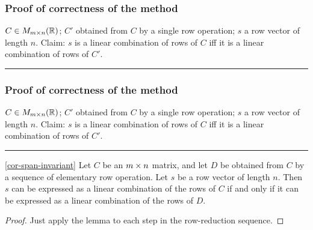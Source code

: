 \documentclass[9pt]{beamer}
\begin{document}
\begin{frame}[t]
 \frametitle{Proof of correctness of the method}
 $C\in M_{m\times n}({\mathbb{R}})$; $C'$ obtained from $C$ by a single row
 operation; $s$ a row vector of length $n$.  Claim: $s$ is a linear
 combination of rows of $C$ iff it is a linear combination of rows of
 $C'$.

 \medskip
 \hrule
 \medskip

\end{frame}

\begin{frame}[t]
 \frametitle{Proof of correctness of the method}
 $C\in M_{m\times n}({\mathbb{R}})$; $C'$ obtained from $C$ by a single row
 operation; $s$ a row vector of length $n$.  Claim: $s$ is a linear
 combination of rows of $C$ iff it is a linear combination of rows of
 $C'$.

 \medskip
 \hrule
 \vspace{6ex}

 \begin{corollary*}{\ref{cor-span-invariant}}
  Let $C$ be an $m\times n$ matrix, and let $D$ be obtained from $C$ by a
  sequence of elementary row operation.  Let $s$ be a row vector of length
  $n$.  Then $s$ can be expressed as a linear combination of the rows
  of $C$ if and only if it can be expressed as a linear combination of
  the rows of $D$.  
 \end{corollary*}
 \begin{proof}
  Just apply the lemma to each step in the row-reduction sequence.
 \end{proof}
\end{frame}
\end{document}
